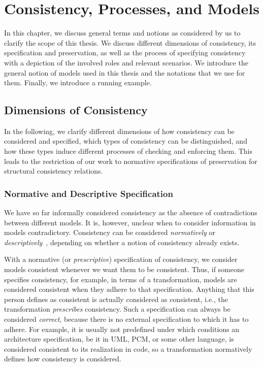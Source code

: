 \chapter{Consistency, Processes, and Models
}
\label{chap:networks}

In this chapter, we discuss general terms and notions as considered by us to clarify the scope of this thesis.
We discuss different dimensions of consistency, its specification and preservation, as well as the process of specifying consistency with a depiction of the involved roles and relevant scenarios.
We introduce the general notion of models used in this thesis and the notations that we use for them.
Finally, we introduce a running example.


\section{Dimensions of Consistency}

In the following, we clarify different dimensions of how consistency can be considered and specified, which types of consistency can be distinguished, and how these types induce different processes of checking and enforcing them.
This leads to the restriction of our work to normative specifications of preservation for structural consistency relations.

\subsection{Normative and Descriptive Specification}
\label{chap:networks:notions:normative_descriptive}

We have so far informally considered consistency as the absence of contradictions between different models.
It is, however, unclear when to consider information in models contradictory.
Consistency can be considered \emph{normatively} or \emph{descriptively}~\cite[Sec.3.1.2]{kramer2017a}, depending on whether a notion of consistency already exists.

With a normative (or \emph{prescriptive}) specification of consistency, we consider models consistent whenever we want them to be consistent.
Thus, if someone specifies consistency, for example, in terms of a transformation, models are considered consistent when they adhere to that specification.
Anything that this person defines as consistent is actually considered as consistent, i.e., the transformation \emph{prescribes} consistency.
Such a specification can always be considered \emph{correct}, because there is no external specification to which it has to adhere.
For example, it is usually not predefined under which conditions an architecture specification, be it in \gls{UML}, \gls{PCM}, or some other language, is considered consistent to its realization in code, so a transformation normatively defines how consistency is considered.


